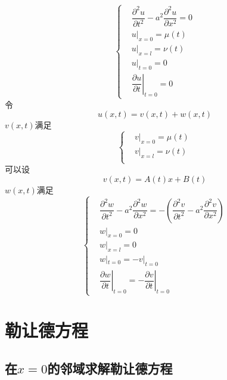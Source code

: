 \documentclass{article}
\begin{document}
\begin{equation*}
  \left\{
  \begin{aligned}
    & \dfrac{\partial^{2} u}{\partial t^{2}} - a^{2} \dfrac{\partial^{2} u}{\partial x^{2}} = 0 \\
    & u |_{x=0} = \mu (t)\\
    & u |_{x=l} = \nu (t)\\
    & u |_{t=0} = 0\\
    & \!\!\left. \dfrac{\partial u}{\partial t} \right|_{t=0} = 0
  \end{aligned}
  \right.
\end{equation*}
令
\begin{equation*}
  u(x,t) = v(x,t) + w(x,t)
\end{equation*}
$v(x,t)$满足
\begin{equation*}
  \left\{
  \begin{aligned}
    & v |_{x=0} = \mu (t)\\
    & v |_{x=l} = \nu (t)\\
  \end{aligned}
  \right.
\end{equation*}
可以设
\begin{equation*}
  v(x,t) = A(t) x + B(t)
\end{equation*}
$w(x,t)$满足
\begin{equation*}
  \left\{
  \begin{aligned}
    & \dfrac{\partial^{2} w}{\partial t^{2}} - a^{2} \dfrac{\partial^{2} w}{\partial x^{2}} = - \left( \dfrac{\partial^{2} v}{\partial t^{2}} - a^{2} \dfrac{\partial^{2} v}{\partial x^{2}} \right) \\
    & w |_{x=0} = 0\\
    & w |_{x=l} = 0\\
    & w |_{t=0} = - v |_{t=0}\\
    & \!\!\left. \dfrac{\partial w}{\partial t} \right|_{t=0} = - \left. \dfrac{\partial v}{\partial t} \right|_{t=0}
  \end{aligned}
  \right.
\end{equation*}



\section{勒让德方程}

\subsection{在$x=0$的邻域求解勒让德方程}
\end{document}
